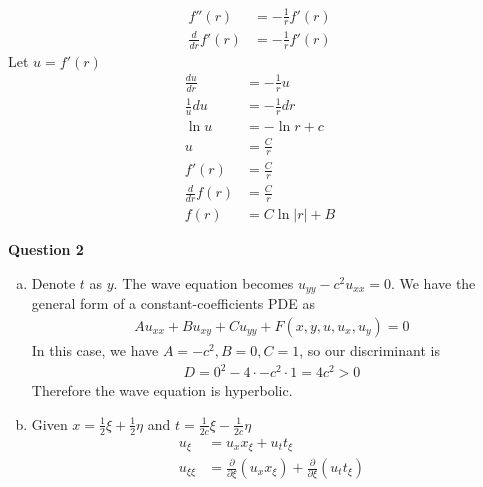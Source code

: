 \documentclass[12pt, letterpaper]{article}
\begin{document}
\begin{enumerate}[(a)]
    \begin{align*}
        f''(r) &= - \frac 1r f'(r) \\
        \frac{d}{dr} f'(r) &= - \frac 1r f'(r)
    \end{align*}
    Let $u = f'(r)$
    \begin{align*}
        \frac{du}{dr} &= -\frac 1r u \\
        \frac 1u du &= -\frac 1r dr \\
        \ln u &= - \ln r + c \\
        u &= \frac{C}{r} \\
        f'(r) &= \frac Cr \\
        \frac{d}{dr} f(r) &= \frac Cr \\
        f(r) &= C\ln|r| + B
    \end{align*}
\end{enumerate}

\newpage
\noindent \textbf{Question 2}
\begin{enumerate}[(a)]
    \item Denote $t$ as $y$. The wave equation becomes $u_{yy} - c^2u_{xx} = 0$. We have
    the general form of a constant-coefficients PDE as 
    \begin{align*}
        Au_{xx}+Bu_{xy} + Cu_{yy} + F(x,y,u,u_x,u_y) = 0
    \end{align*}
    In this case, we have $A = -c^2, B = 0, C = 1$, so our discriminant is 
    \begin{align*}
        D = 0^2 - 4\cdot -c^2 \cdot 1 = 4c^2 > 0
    \end{align*}
    Therefore the wave equation is hyperbolic.
    \item Given $\displaystyle x = \frac 12 \xi + \frac 12 \eta$ and $\displaystyle t = \frac{1}{2c}\xi - \frac{1}{2c}\eta$
    \begin{align*}
        u_\xi &= u_x x_\xi + u_t t_\xi \\
        u_{\xi\xi} &= \frac{\partial}{\partial \xi}(u_x x_\xi) + \frac{\partial}{\partial \xi}(u_t t_\xi)
    \end{align*}
\end{enumerate}
\end{document}

